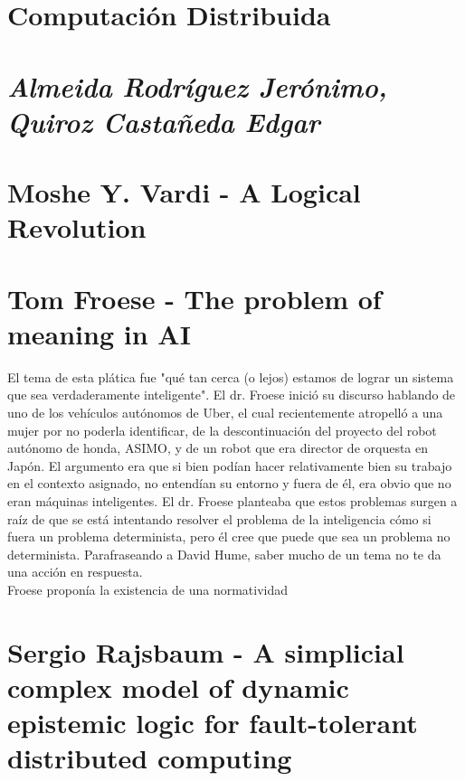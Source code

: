 \documentclass[a4paper,12pt]{article}
\begin{document}
\begin{center}
	\section*{Computación Distribuida}
	\section*{\textit{Almeida Rodríguez Jerónimo, Quiroz Castañeda Edgar}}
\end{center}
\section{Moshe Y. Vardi - A Logical Revolution}


\section{Tom Froese - The problem of meaning in AI}
El tema de esta plática fue "qué tan cerca (o lejos) estamos de lograr un sistema que sea verdaderamente inteligente". El dr. Froese inició su discurso hablando de uno de los vehículos autónomos de Uber, el cual recientemente atropelló a una mujer por no poderla identificar, de la descontinuación del proyecto del robot autónomo de honda, ASIMO, y de un robot que era director de orquesta en Japón. El argumento era que si bien podían hacer relativamente bien su trabajo en el contexto asignado, no entendían su entorno y fuera de él, era obvio que no eran máquinas inteligentes.
El dr. Froese planteaba que estos problemas surgen a raíz de que se está intentando resolver el problema de la inteligencia cómo si fuera un problema determinista, pero él cree que puede que sea un problema no determinista. Parafraseando a David Hume, saber mucho de un tema no te da una acción en respuesta.\\
Froese proponía la existencia de una normatividad

\section{Sergio Rajsbaum - A simplicial complex model of dynamic epistemic logic for fault-tolerant distributed computing}
 
\end{document}
